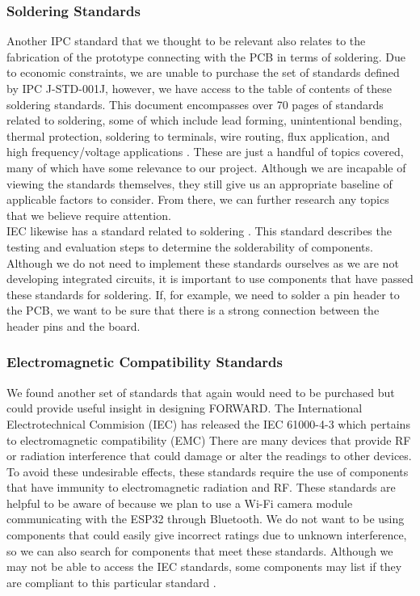 \subsubsection{Soldering Standards}
\noindent Another IPC standard that we thought to be relevant also relates to the fabrication of the prototype connecting with the PCB in terms of soldering. Due to economic constraints, we are unable to purchase the set of standards defined by IPC J-STD-001J, however, we have access to the table of contents of these soldering standards. This document encompasses over 70 pages of standards related to soldering, some of which include lead forming, unintentional bending, thermal protection, soldering to terminals, wire routing, flux application, and high frequency/voltage applications \cite{ipc_standard}. These are just a handful of topics covered, many of which have some relevance to our project. Although we are incapable of viewing the standards themselves, they still give us an appropriate baseline of applicable factors to consider. From there, we can further research any topics that we believe require attention.\\

\noindent IEC likewise has a standard related to soldering \cite{iec6006869ed2017}. This standard describes the testing and evaluation steps to determine the solderability of components. Although we do not need to implement these standards ourselves as we are not developing integrated circuits, it is important to use components that have passed these standards for soldering. If, for example, we need to solder a pin header to the PCB, we want to be sure that there is a strong connection between the header pins and the board.

\subsubsection{Electromagnetic Compatibility Standards}
\noindent We found another set of standards that again would need to be purchased but could  provide useful insight in designing FORWARD. The International Electrotechnical Commision (IEC) has released the IEC 61000-4-3 which pertains to electromagnetic compatibility (EMC) There are many devices that provide RF or radiation interference that could damage or alter the readings to other devices. To avoid these undesirable effects, these standards require the use of components that have immunity to electromagnetic radiation and RF. These standards are helpful to be aware of because we plan to use a Wi-Fi camera module communicating with the ESP32 through Bluetooth. We do not want to be using components that could easily give incorrect ratings due to unknown interference, so we can also search for components that meet these standards. Although we may not be able to access the IEC standards, some components may list if they are compliant to this particular standard \cite{iec_standard}.\\

